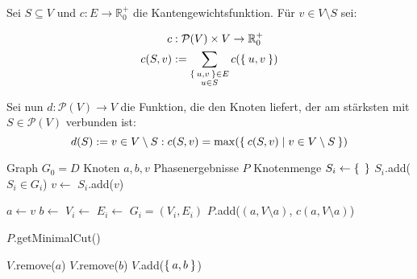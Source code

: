 \documentclass{article}
\begin{document}
\begin{preview}
    Sei $S \subseteq V$ und $c:E\rightarrow\mathbb{R}_0^+$ die
    Kantengewichtsfunktion.
    Für $v \in V \setminus S$ sei:

        \begin{align*}
            c &:\mathcal{P}(V) \times V \rightarrow \mathbb{R}_0^+\\
        c(S,v) &:= \sum_{\substack{\Set{u,v} \in E\\ u \in S}} c(\Set{u,v})
        \end{align*}

    Sei nun $d: \mathcal{P}(V) \rightarrow V$ die Funktion, die den
    Knoten liefert, der am stärksten mit $S \in \mathcal{P}(V)$
    verbunden ist:
        \[d(S) := v \in V \setminus S: c(S, v) = \max(\Set{c(S,v) | v \in V \setminus S})\]

    \begin{algorithm}[H]
        \begin{algorithmic}
                \State Graph $G_0 = D$
                \State Knoten $a,b,v$
                \State Phasenergebnisse $P$ 
                    \State Knotenmenge $S_i \gets \Set{}$
                    \State $S_i$.add($S_i \in G_i$) 
                        \State $v \gets$ 
                        \State $S_i$.add($v$)
                    \EndWhile

                    \State $a \gets v$
                    \State $b \gets$ 
                    \State $V_i \gets$ 
                    \State $E_i \gets$ 
                    \State $G_i = (V_i, E_i)$
                    \State $P$.add($(a, V \setminus a)$, $c(a, V \setminus a)$)
                \EndFor

                \State \Return $P$.getMinimalCut()
            \EndFunction

                \State $V$.remove($a$)
                \State $V$.remove($b$)
                \State {}
                \State $V$.add($\Set{a, b}$)
            \EndFunction


\end{algorithmic}
\end{algorithm}
\end{preview}
\end{document}
